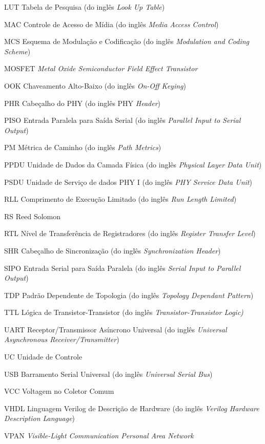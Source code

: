 \documentclass[
	12pt,				%
	openright,			%
	oneside,			%
	a4paper,			%
	hyphens,			%
	english,			%
	brazil				%
]{abntex2}
\begin{document}
\begin{siglas}
		\item[LUT] Tabela de Pesquisa (do inglês \emph{Look Up Table})
		\item[MAC] Controle de Acesso de Mídia (do inglês \emph{Media Access Control})
		\item[MCS] Esquema de Modulação e Codificação (do inglês \emph{Modulation and Coding Scheme})
		\item[MOSFET] \emph{Metal Oxide Semiconductor Field Effect Transistor}
		\item[OOK] Chaveamento Alto-Baixo (do inglês \emph{On-Off Keying})
		\item[PHR] Cabeçalho do PHY (do inglês PHY \emph{Header})
		\item[PISO] Entrada Paralela para Saída Serial (do inglês \emph{Parallel Input to Serial Output})
		\item[PM] Métrica de Caminho (do inglês \emph{Path Metrics})
		\item[PPDU] Unidade de Dados da Camada Física (do inglês \emph{Physical Layer Data Unit})
		\item[PSDU] Unidade de Serviço de dados PHY I (do inglês \emph{PHY Service Data Unit})
		\item[RLL] Comprimento de Execução Limitado (do inglês \emph{Run Length Limited})
		\item[RS] Reed Solomon
		\item[RTL] Nível de Transferência de Registradores (do inglês \emph{Register Transfer Level})
		\item[SHR] Cabeçalho de Sincronização (do inglês \emph{Synchronization Header})
		\item[SIPO] Entrada Serial para Saída Paralela (do inglês \emph{Serial Input to Parallel Output})
		\item[TDP] Padrão Dependente de Topologia (do inglês \emph{Topology Dependant Pattern})
		\item[TTL] Lógica de Transistor-Transistor (do inglês \emph{Transistor-Transistor Logic)}
		\item[UART] Receptor/Transmissor Asíncrono Universal (do inglês \emph{Universal Asynchronous Receiver/Transmitter})
		\item[UC] Unidade de Controle
		\item[USB] Barramento Serial Universal (do inglês \emph{Universal Serial Bus})
		\item[VCC] Voltagem no Coletor Comum
		\item[VHDL] Linguagem Verilog de Descrição de Hardware (do inglês \emph{Verilog Hardware Description Language})
		\item[VPAN] \emph{Visible-Light Communication Personal Area Network}
	\end{siglas}
\end{document}
